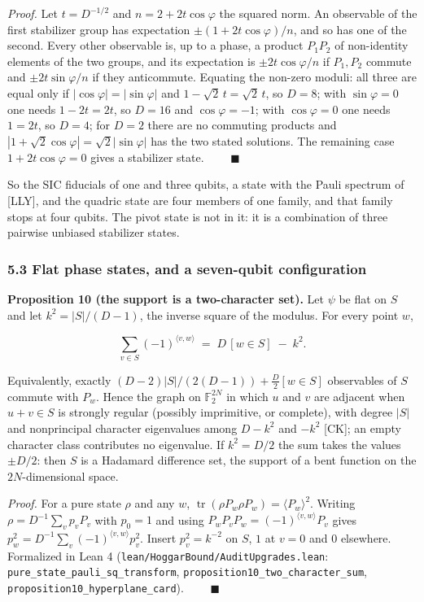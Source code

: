 \documentclass[11pt,a4paper]{article}
\begin{document}
\emph{Proof.} Let \(t = D^{-1/2}\) and \(n = 2 + 2t\cos\varphi\) the squared norm. An observable of the first
stabilizer group has expectation \(\pm(1 + 2t\cos\varphi)/n\), and so has one of the second. Every other
observable is, up to a phase, a product \(P_1P_2\) of non-identity elements of the two groups, and its
expectation is \(\pm 2t\cos\varphi/n\) if \(P_1, P_2\) commute and \(\pm 2t\sin\varphi/n\) if they anticommute.
Equating the non-zero moduli: all three are equal only if \(|\cos\varphi| = |\sin\varphi|\) and
\(1 - \sqrt2\,t = \sqrt2\,t\), so \(D = 8\); with \(\sin\varphi = 0\) one needs \(1 - 2t = 2t\), so \(D = 16\) and
\(\cos\varphi = -1\); with \(\cos\varphi = 0\) one needs \(1 = 2t\), so \(D = 4\); for \(D = 2\) there are no
commuting products and \(|1 + \sqrt2\cos\varphi| = \sqrt2|\sin\varphi|\) has the two stated solutions.
The remaining case \(1 + 2t\cos\varphi = 0\) gives a stabilizer state. \(\qquad\blacksquare\)

So the SIC fiducials of one and three qubits, a state with the Pauli spectrum of {[}LLY{]}, and the
quadric state are four members of one family, and that family stops at four qubits. The pivot state is
not in it: it is a combination of three pairwise unbiased stabilizer states.

\subsubsection{5.3 Flat phase states, and a seven-qubit configuration}\label{53-flat-phase-states-and-a-seven-qubit-configuration}

\textbf{Proposition 10 (the support is a two-character set).} Let \(\psi\) be flat on \(S\) and let
\(k^2 = |S|/(D-1)\), the inverse square of the modulus. For every point \(w\),

\[\sum_{v \in S} (-1)^{\langle v, w\rangle} \;=\; D\,[w \in S] \;-\; k^2 .\]

Equivalently, exactly \((D-2)|S|/(2(D-1)) + \tfrac{D}{2}[w \in S]\) observables of \(S\) commute with \(P_w\).
Hence the graph on \(\mathbb{F}_2^{2N}\) in which \(u\) and \(v\) are adjacent when \(u + v \in S\) is strongly
regular (possibly imprimitive, or complete), with degree \(|S|\) and nonprincipal character eigenvalues
among \(D-k^2\) and \(-k^2\) {[}CK{]}; an empty character class contributes no eigenvalue. If \(k^2 = D/2\) the sum takes
the values \(\pm D/2\): then \(S\) is a Hadamard difference set, the support of a bent function on the
\(2N\)-dimensional space.

\emph{Proof.} For a pure state \(\rho\) and any \(w\), \(\operatorname{tr}(\rho P_w \rho P_w) = \langle P_w\rangle^2\).
Writing \(\rho = D^{-1}\sum_v p_v P_v\) with \(p_0 = 1\) and using \(P_wP_vP_w = (-1)^{\langle v,w\rangle}P_v\)
gives \(p_w^2 = D^{-1}\sum_v (-1)^{\langle v,w\rangle}p_v^2\). Insert \(p_v^2 = k^{-2}\) on \(S\), \(1\) at \(v = 0\)
and \(0\) elsewhere. Formalized in Lean 4 (\nolinkurl{lean/HoggarBound/AuditUpgrades.lean}:
\nolinkurl{pure_state_pauli_sq_transform}, \nolinkurl{proposition10_two_character_sum}, \nolinkurl{proposition10_hyperplane_card}).
\(\qquad\blacksquare\)
\end{document}
